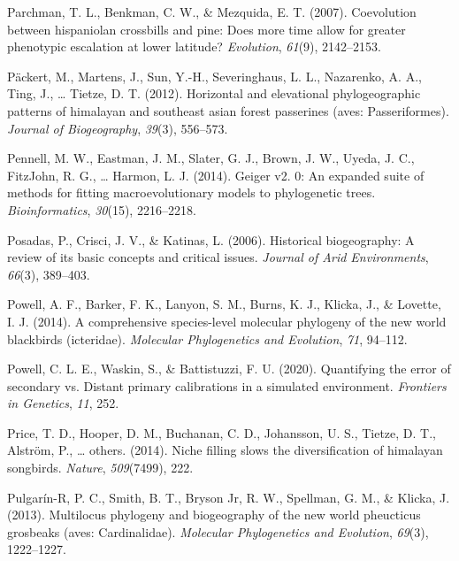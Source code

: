 \documentclass[english,man]{apa6}
\begin{document}
\leavevmode\hypertarget{ref-parchman2007coevolution}{}%
Parchman, T. L., Benkman, C. W., \& Mezquida, E. T. (2007). Coevolution between hispaniolan crossbills and pine: Does more time allow for greater phenotypic escalation at lower latitude? \emph{Evolution}, \emph{61}(9), 2142--2153.

\leavevmode\hypertarget{ref-packert2012horizontal}{}%
Päckert, M., Martens, J., Sun, Y.-H., Severinghaus, L. L., Nazarenko, A. A., Ting, J., \ldots{} Tietze, D. T. (2012). Horizontal and elevational phylogeographic patterns of himalayan and southeast asian forest passerines (aves: Passeriformes). \emph{Journal of Biogeography}, \emph{39}(3), 556--573.

\leavevmode\hypertarget{ref-pennell2014geiger}{}%
Pennell, M. W., Eastman, J. M., Slater, G. J., Brown, J. W., Uyeda, J. C., FitzJohn, R. G., \ldots{} Harmon, L. J. (2014). Geiger v2. 0: An expanded suite of methods for fitting macroevolutionary models to phylogenetic trees. \emph{Bioinformatics}, \emph{30}(15), 2216--2218.

\leavevmode\hypertarget{ref-posadas2006historical}{}%
Posadas, P., Crisci, J. V., \& Katinas, L. (2006). Historical biogeography: A review of its basic concepts and critical issues. \emph{Journal of Arid Environments}, \emph{66}(3), 389--403.

\leavevmode\hypertarget{ref-powell2014comprehensive}{}%
Powell, A. F., Barker, F. K., Lanyon, S. M., Burns, K. J., Klicka, J., \& Lovette, I. J. (2014). A comprehensive species-level molecular phylogeny of the new world blackbirds (icteridae). \emph{Molecular Phylogenetics and Evolution}, \emph{71}, 94--112.

\leavevmode\hypertarget{ref-powell2020quantifying}{}%
Powell, C. L. E., Waskin, S., \& Battistuzzi, F. U. (2020). Quantifying the error of secondary vs. Distant primary calibrations in a simulated environment. \emph{Frontiers in Genetics}, \emph{11}, 252.

\leavevmode\hypertarget{ref-price2014niche}{}%
Price, T. D., Hooper, D. M., Buchanan, C. D., Johansson, U. S., Tietze, D. T., Alström, P., \ldots{} others. (2014). Niche filling slows the diversification of himalayan songbirds. \emph{Nature}, \emph{509}(7499), 222.

\leavevmode\hypertarget{ref-pulgarin2013multilocus}{}%
Pulgarín-R, P. C., Smith, B. T., Bryson Jr, R. W., Spellman, G. M., \& Klicka, J. (2013). Multilocus phylogeny and biogeography of the new world pheucticus grosbeaks (aves: Cardinalidae). \emph{Molecular Phylogenetics and Evolution}, \emph{69}(3), 1222--1227.
\end{document}
